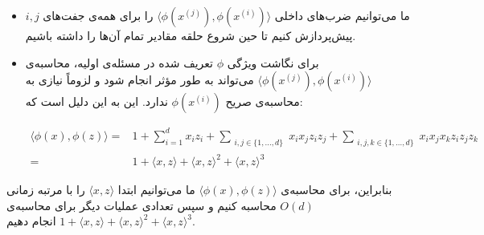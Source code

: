 \documentclass[12pt]{article}
\begin{document}
\begin{itemize}
\item
ما می‌توانیم ضرب‌های داخلی
$\langle\phi(x^{(j)}),\phi(x^{(i)})\rangle$
را برای همه‌ی جفت‌های
$i, j$
پیش‌پردازش کنیم تا حین شروع حلقه مقادیر تمام آن‌ها را داشته باشیم.
\item
برای نگاشت ویژگی
$\phi$
تعریف شده در مسئله‌ی اولیه، محاسبه‌ی
$\langle\phi(x^{(j)}),\phi(x^{(i)})\rangle$
می‌تواند به طور مؤثر انجام شود و لزوماً نیازی به محاسبه‌ی صریح
$\phi(x^{(i)})$
ندارد. این به این دلیل است که:
\begin{center}
\setLR\begin{align*}
\langle\phi(x), \phi(z)\rangle = &  1 + \sum_{i=1}^{d} x_i z_i + \sum_{\substack{i,j \in \{1, \ldots, d\}}} x_i x_j z_i z_j + \sum_{\substack{i,j,k \in \{1, \ldots, d\}}} x_i x_j x_k z_i z_j z_k \\
=  & 1 + \langle x, z\rangle + \langle x, z\rangle^2 + \langle x, z\rangle^3
\end{align*}
\end{center}
\end{itemize}
بنابراین، برای محاسبه‌ی
$\langle\phi(x), \phi(z)\rangle$
ما می‌توانیم ابتدا
$\langle x, z\rangle$
را با مرتبه زمانی
$O(d)$
محاسبه کنیم و سپس تعدادی عملیات دیگر برای محاسبه‌ی
$1 + \langle x, z\rangle + \langle x, z\rangle^2 + \langle x, z\rangle^3$
انجام دهیم.
\end{document}
